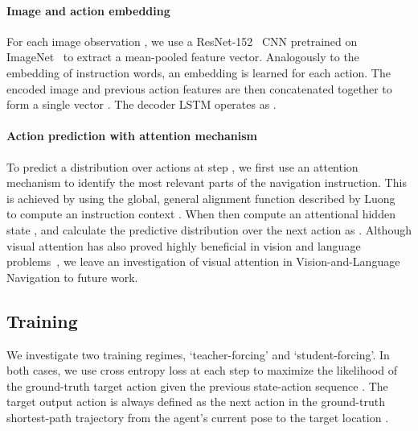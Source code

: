 \documentclass[10pt,twocolumn,letterpaper]{article}
\begin{document}
\vspace{-0.3cm}
\paragraph{Image and action embedding}

For each image observation , we use a ResNet-152~\cite{he2015deep} CNN pretrained on ImageNet~\cite{ILSVRC15} to extract a mean-pooled feature vector. Analogously to the embedding of instruction words, an embedding is learned for each action. The encoded image and previous action features are then concatenated together to form a single vector . The decoder LSTM operates as . 

\vspace{-0.3cm}
\paragraph{Action prediction with attention mechanism}

To predict a distribution over actions at step , we first use an attention mechanism to identify the most relevant parts of the navigation instruction. This is achieved by using the global, general alignment function described by Luong \etal~\cite{luong2015effective} to compute an instruction context . When then compute an attentional hidden state , and calculate the predictive distribution over the next action as . Although visual attention has also proved highly beneficial in vision and language problems~\cite{stacked,coatt,Anderson2017up-down}, we leave an investigation of visual attention in Vision-and-Language Navigation to future work. 

\subsection{Training}



We investigate two training regimes, `teacher-forcing' and `student-forcing'. In both cases, we use cross entropy loss at each step to maximize the likelihood of the ground-truth target action  given the previous state-action sequence . The target output action  is always defined as the next action in the ground-truth shortest-path trajectory from the agent's current pose  to the target location .
\end{document}
